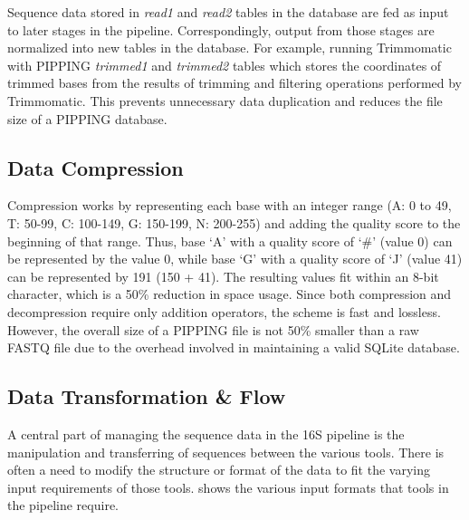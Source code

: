 \documentclass[12pt]{article}
\begin{document}
	Sequence data stored in \emph{read1} and \emph{read2} tables in the database are fed as input 
	to later stages in the pipeline. Correspondingly, output from those stages are 
	normalized into new tables in the database. For example, running Trimmomatic with 
	PIPPING \emph{trimmed1} and \emph{trimmed2} tables which stores the coordinates 
	of trimmed bases from the results of trimming and filtering operations performed by Trimmomatic. 
	This prevents unnecessary data duplication and reduces the file size of a PIPPING 
	database.


	\subsection{Data Compression} %
	\label{sub:data_compression}
	Compression works by representing
	each base with an integer range (A: 0 to 49, T: 50-99, C: 100-149, G: 150-199, N: 200-255)
	and adding the quality score to the beginning of that range. Thus, base `A' with a 
	quality score of `\#' (value 0) can be represented by the value 0, while base `G' with
	a quality score of `J' (value 41) can be represented by 191 (150 + 41). The resulting
	values fit within an 8-bit character, which is a 50\% reduction in space usage. 
	Since both compression and decompression require only addition operators, the scheme
	is fast and lossless. However, the overall size of a PIPPING file is not 50\% smaller 
	than a raw FASTQ file due to the overhead involved in maintaining a valid SQLite 
	database.

	
	\subsection{Data Transformation \& Flow} %
	\label{sec:data_transformation}
	A central part of managing the sequence data in the 16S pipeline is the manipulation
	and transferring of sequences between the various tools. There is often a need
	to modify the structure or format of the data to fit the varying input requirements
	of those tools.  shows the various input formats that
	tools in the pipeline require.
\end{document}
